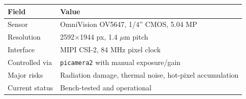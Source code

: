 \begin{longtable}{L{4cm}Y}
\toprule
\textbf{Field} & \textbf{Value} \\
\midrule
Sensor & OmniVision OV5647, 1/4'' CMOS, 5.04 MP \\
Resolution & 2592$\times$1944 px, 1.4 $\mu$m pitch \\
Interface & MIPI CSI-2, 84 MHz pixel clock \\
Controlled via & \texttt{picamera2} with manual exposure/gain \\
Major risks & Radiation damage, thermal noise, hot-pixel accumulation \\
Current status & Bench-tested and operational \\
\bottomrule
\end{longtable}

